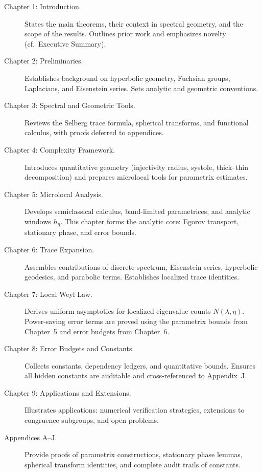\begin{description}
  \item[Chapter 1: Introduction.]
  States the main theorems, their context in spectral geometry, and the scope
  of the results. Outlines prior work and emphasizes novelty (cf.\ Executive Summary).
  
  \item[Chapter 2: Preliminaries.]
  Establishes background on hyperbolic geometry, Fuchsian groups,
  Laplacians, and Eisenstein series. Sets analytic and geometric conventions.
  
  \item[Chapter 3: Spectral and Geometric Tools.]
  Reviews the Selberg trace formula, spherical transforms,
  and functional calculus, with proofs deferred to appendices.
  
  \item[Chapter 4: Complexity Framework.]
  Introduces quantitative geometry (injectivity radius, systole, thick–thin decomposition)
  and prepares microlocal tools for parametrix estimates.
  
  \item[Chapter 5: Microlocal Analysis.]
  Develops semiclassical calculus, band-limited parametrices, and analytic windows $h_\eta$.
  This chapter forms the analytic core: Egorov transport, stationary phase, and error bounds.
  
  \item[Chapter 6: Trace Expansion.]
  Assembles contributions of discrete spectrum, Eisenstein series, hyperbolic geodesics,
  and parabolic terms. Establishes localized trace identities.
  
  \item[Chapter 7: Local Weyl Law.]
  Derives uniform asymptotics for localized eigenvalue counts $N(\lambda,\eta)$.
  Power-saving error terms are proved using the parametrix bounds from Chapter~5
  and error budgets from Chapter~6.
  
  \item[Chapter 8: Error Budgets and Constants.]
  Collects constants, dependency ledgers, and quantitative bounds.
  Ensures all hidden constants are auditable and cross-referenced to Appendix~J.
  
  \item[Chapter 9: Applications and Extensions.]
  Illustrates applications: numerical verification strategies,
  extensions to congruence subgroups, and open problems.
  
  \item[Appendices A–J.]
  Provide proofs of parametrix constructions, stationary phase lemmas,
  spherical transform identities, and complete audit trails of constants.
\end{description}

